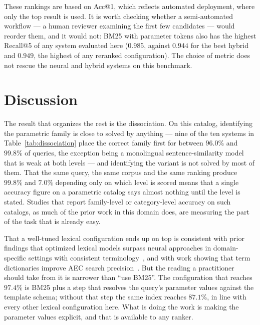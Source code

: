 \documentclass[preprint,review,12pt]{elsarticle}
\begin{document}
These rankings are based on Acc@1, which reflects automated deployment, where only the top result is used. It is worth checking whether a semi-automated workflow --- a human reviewer examining the first few candidates --- would reorder them, and it would not: BM25 with parameter tokens also has the highest Recall@5 of any system evaluated here ($0.985$, against $0.944$ for the best hybrid and $0.949$, the highest of any reranked configuration). The choice of metric does not rescue the neural and hybrid systems on this benchmark.


\section{Discussion}
\label{sec:discussion}

The result that organizes the rest is the dissociation. On this catalog, identifying the parametric family is close to solved by anything --- nine of the ten systems in Table~\ref{tab:dissociation} place the correct family first for between $96.0\%$ and $99.8\%$ of queries, the exception being a monolingual sentence-similarity model that is weak at both levels --- and identifying the variant is not solved by most of them. That the same query, the same corpus and the same ranking produce $99.8\%$ and $7.0\%$ depending only on which level is scored means that a single accuracy figure on a parametric catalog says almost nothing until the level is stated. Studies that report family-level or category-level accuracy on such catalogs, as much of the prior work in this domain does, are measuring the part of the task that is already easy.

That a well-tuned lexical configuration ends up on top is consistent with prior findings that optimized lexical models surpass neural approaches in domain-specific settings with consistent terminology~\cite{thakur2021beir}, and with work showing that term dictionaries improve AEC search precision~\cite{fan2015project}. But the reading a practitioner should take from it is narrower than ``use BM25''. The configuration that reaches $97.4\%$ is BM25 plus a step that resolves the query's parameter values against the template schema; without that step the same index reaches $87.1\%$, in line with every other lexical configuration here. What is doing the work is making the parameter values explicit, and that is available to any ranker.
\end{document}
